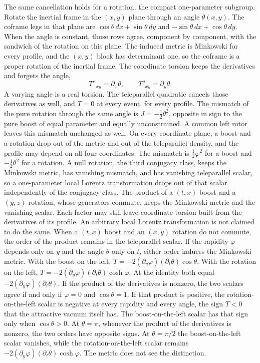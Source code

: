 \documentclass[a4paper]{article}
\begin{document}
The same cancellation holds for a rotation, the compact one-parameter subgroup. Rotate the inertial frame in the $(x,y)$ plane through an angle $\theta(x,y)$. The coframe legs in that plane are $\cos\theta\,dx+\sin\theta\,dy$ and $-\sin\theta\,dx+\cos\theta\,dy$. When the angle is constant, those rows agree, component by component, with the sandwich of the rotation on this plane. The induced metric is Minkowski for every profile, and the $(x,y)$ block has determinant one, so the coframe is a proper rotation of the inertial frame. The coordinate torsion keeps the derivatives and forgets the angle,
\[
T^x{}_{xy}=\partial_x\theta,\qquad T^y{}_{xy}=\partial_y\theta.
\]
A varying angle is a real torsion. The teleparallel quadratic cancels those derivatives as well, and $T=0$ at every event, for every profile. The mismatch of the pure rotation through the same angle is $J=-\tfrac12\theta^2$, opposite in sign to the pure boost of equal parameter and equally unconstrained. A common left rotor leaves this mismatch unchanged as well. On every coordinate plane, a boost and a rotation drop out of the metric and out of the teleparallel density, and the profile may depend on all four coordinates. The mismatch is $\tfrac12\varphi^2$ for a boost and $-\tfrac12\theta^2$ for a rotation. A null rotation, the third conjugacy class, keeps the Minkowski metric, has vanishing mismatch, and has vanishing teleparallel scalar, so a one-parameter local Lorentz transformation drops out of that scalar independently of the conjugacy class. The product of a $(t,x)$ boost and a $(y,z)$ rotation, whose generators commute, keeps the Minkowski metric and the vanishing scalar. Each factor may still leave coordinate torsion built from the derivatives of its profile. An arbitrary local Lorentz transformation is not claimed to do the same. When a $(t,x)$ boost and an $(x,y)$ rotation do not commute, the order of the product remains in the teleparallel scalar. If the rapidity $\varphi$ depends only on $y$ and the angle $\theta$ only on $t$, either order induces the Minkowski metric. With the boost on the left, $T=-2(\partial_y\varphi)(\partial_t\theta)\cos\theta$. With the rotation on the left, $T=-2(\partial_y\varphi)(\partial_t\theta)\cosh\varphi$. At the identity both equal $-2(\partial_y\varphi)(\partial_t\theta)$. If the product of the derivatives is nonzero, the two scalars agree if and only if $\varphi=0$ and $\cos\theta=1$. If that product is positive, the rotation-on-the-left scalar is negative at every rapidity and every angle, the sign $T<0$ that the attractive vacuum itself has. The boost-on-the-left scalar has that sign only when $\cos\theta>0$. At $\theta=\pi$, whenever the product of the derivatives is nonzero, the two orders have opposite signs. At $\theta=\pi/2$ the boost-on-the-left scalar vanishes, while the rotation-on-the-left scalar remains $-2(\partial_y\varphi)(\partial_t\theta)\cosh\varphi$. The metric does not see the distinction.
\end{document}
